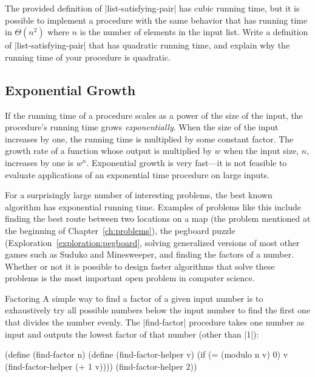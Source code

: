 \begin{schemeregion}
{\begin{exercise} \doublegoldstar
The provided definition of \scheme|list-satisfying-pair| has cubic running time, but it is possible to implement a procedure with the same behavior that has running time in $\Theta(n^2)$ where $n$ is the number of elements in the input list.  Write a definition of \scheme|list-satisfying-pair| that has quadratic running time, and explain why the running time of your procedure is quadratic.
\end{exercise}
}

\subsection{Exponential Growth}

If the running time of a procedure scales as a power of the size of the input, the procedure's running time grows \emph{exponentially}.  When the size of the input increases by one, the running time is multiplied by some constant factor.  The growth rate of a function whose output is multiplied by $w$ when the input size, $n$, increases by one is $w^n$.  Exponential growth is very fast---it is not feasible to evaluate applications of an exponential time procedure on large inputs.  


For a surprisingly large number of interesting problems, the best known algorithm has exponential running time.  Examples of problems like this include finding the best route between two locations on a map (the problem mentioned at the beginning of Chapter~\ref{ch:problems}), the pegboard puzzle (Exploration~\ref{exploration:pegboard}, solving generalized versions of most other games such as Suduko and Mine\-sweeper, and finding the factors of a number.  Whether or not it is possible to design faster algorithms that solve these problems is the most important open problem in computer science.


\begin{examplenobar}{Factoring} A simple way to find a factor of a given input number is to exhaustively try all possible numbers below the input number to find the first one that divides the number evenly.  
The \scheme|find-factor| procedure takes one number as input and outputs the lowest factor of that number (other than \scheme|1|):
\begin{schemedisplay}
(define (find-factor n)
  (define (find-factor-helper v)
    (if (= (modulo n v) 0) v (find-factor-helper (+ 1 v))))
  (find-factor-helper 2))
\end{schemedisplay}


\end{examplenobar}
\end{schemeregion}
